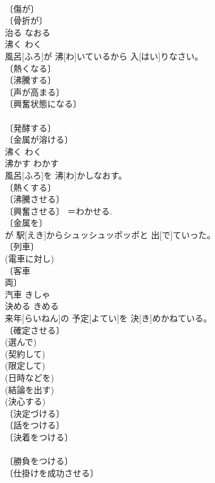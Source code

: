 \documentclass[8pt]{extreport}
\begin{document}
\begin{CJK}{UTF8}{min}
\\	〔傷が〕 
\\	〔骨折が〕 
\\	治る	なおる	
\\	沸く	わく	
\\	風呂[ふろ]が 沸[わ]いているから 入[はい]りなさい。	
\\	〔熱くなる〕 
\\	〔沸騰する〕 
\\	〔声が高まる〕 
\\	〔興奮状態になる〕 
\\	[⇒わきかえる] 
\\	〔発酵する〕 
\\	〔金属が溶ける〕 
\\	沸く	わく	
\\	沸かす	わかす	
\\	風呂[ふろ]を 沸[わ]かしなおす。	
\\	〔熱くする〕 
\\	〔沸騰させる〕 
\\	〔興奮させる〕 ＝わかせる. 
\\	〔金属を〕 
\\	[＝とかす２ 
\\	沸かす	わかす	
\\	汽車	きしゃ	
\\	汽車[きしゃ]が 駅[えき]からシュッシュッポッポと 出[で]ていった。	
\\	〔列車〕 
\\	(電車に対し) 
\\	〔客車 
\\	両〕 
\\	[⇒れっしゃ１]	汽車	きしゃ	
\\	決める	きめる	
\\	来年[らいねん]の 予定[よてい]を 決[き]めかねている。	
\\	〔確定させる〕 
\\	(選んで) 
\\	(契約して) 
\\	(限定して) 
\\	(日時などを) 
\\	(結論を出す) 
\\	(決心する) 
\\	〔決定づける〕 
\\	〔話をつける〕 
\\	〔決着をつける〕 
\\	[⇒きめている] 
\\	〔勝負をつける〕 
\\	〔仕掛けを成功させる〕 

\end{CJK}
\end{document}
